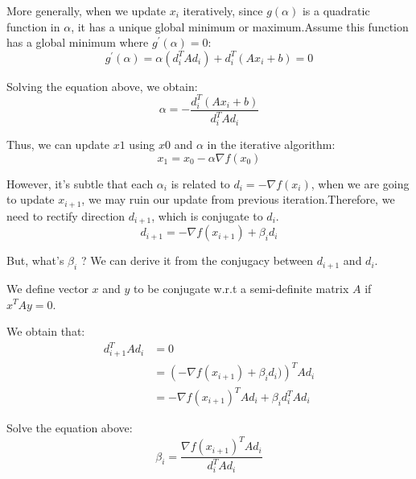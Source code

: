 \documentclass[titlepage,a4paper,12pt]{article}
\begin{document}
More generally, when we update $x_i$ iteratively, since $g(\alpha)$ is a quadratic function in $\alpha$, it has a unique global minimum or maximum.Assume this function has a global minimum where $g^{\prime}(\alpha) = 0$:
\begin{equation}
	g^{\prime}(\alpha) = \alpha (d_i^{T} A d_i) + d_i^{T} (A x_i + b) = 0
\end{equation}

Solving the equation above, we obtain:
\begin{equation}
	\alpha = - \frac{d_i^{T} (A x_i + b)}{d_i^{T} A d_i}
\end{equation}

Thus, we can update $x1$ using $x0$ and $\alpha$ in the iterative algorithm:
\begin{equation}
	x_{1} = x_0 - \alpha \nabla f(x_0)
\end{equation}

However, it's subtle that each $\alpha_i$ is related to $d_i = -\nabla f(x_i)$, when we are going to update $x_{i + 1}$, we may ruin our update from previous iteration.Therefore, we need to rectify direction $d_{i + 1}$, which is conjugate to $d_i$.
\begin{equation}
	d_{i + 1} = - \nabla f(x_{i + 1}) + \beta_i d_i
\end{equation}

But, what's $\beta_i$ ? We can derive it from the conjugacy between $d_{i + 1}$ and $d_i$.

We define vector $x$ and $y$ to be conjugate w.r.t a semi-definite matrix $A$ if $x^{T} A y = 0$.

We obtain that: 
\begin{equation}
\begin{aligned}
	d_{i + 1}^{T} A d_i &= 0 \\
						&= \left( - \nabla f(x_{i + 1}) + \beta_i d_i) \right)^{T} A d_i \\
						&= -\nabla f(x_{i + 1})^{T} A d_i + \beta_i d_i^{T} A d_i
\end{aligned}
\end{equation}

Solve the equation above:
\begin{equation}
	\beta_i = \frac{\nabla f(x_{i + 1})^{T} A d_i}{d_i^{T} A d_i}
\end{equation}
\end{document}
